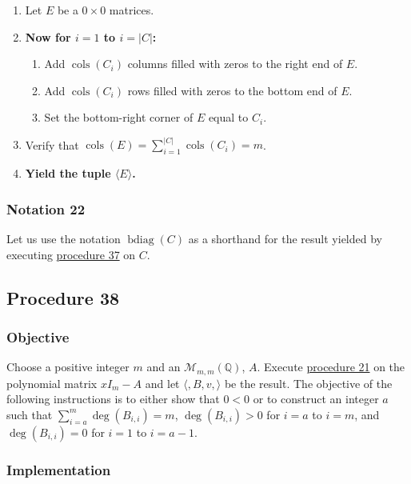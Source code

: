 \documentclass[twocolumn]{article}
\DeclareMathOperator{\bdiag}{bdiag}
\DeclareMathOperator{\cols}{cols}
\newcommand{\notation}[1]{\subsubsection*{Notation #1}}
\newcommand{\procedure}[2][]{\subsection*{Procedure #2 \ifthenelse{\equal{#1}{}}{}{(#1)}}\label{sec:procedure #2}}
\newcommand{\objective}{\subsubsection*{Objective}}
\newcommand{\implementation}{\subsubsection*{Implementation}}
\begin{document}
				\begin{enumerate}
					\item Let $E$ be a $0\times 0$ matrices.
					\item \textbf{Now for $i=1$ to $i=\lvert C\rvert$:}
					\begin{enumerate}
						\item Add $\cols(C_i)$ columns filled with zeros to the right end of $E$.
						\item Add $\cols(C_i)$ rows filled with zeros to the bottom end of $E$.
						\item Set the bottom-right corner of $E$ equal to $C_i$.
					\end{enumerate}
					\item Verify that $\cols(E)=\sum_{i=1}^{\lvert C\rvert}\cols(C_i)=m$.
					\item \textbf{Yield the tuple $\langle E\rangle$.}
				\end{enumerate}
		\notation{22}
			Let us use the notation $\bdiag(C)$ as a shorthand for the result yielded by executing \hyperref[sec:procedure 37]{procedure 37} on $C$.
		\procedure{38}
			\objective
				Choose a positive integer $m$ and an $\mathcal{M}_{m,m}(\mathbb{Q})$, $A$. Execute \hyperref[sec:procedure 21]{procedure 21} on the polynomial matrix $xI_m-A$ and let $\langle ,B,v,\rangle$ be the result. The objective of the following instructions is to either show that $0<0$ or to construct an integer $a$ such that $\sum_{i=a}^m\deg(B_{i,i})=m$, $\deg(B_{i,i})>0$ for $i=a$ to $i=m$, and $\deg(B_{i,i})=0$ for $i=1$ to $i=a-1$.
			\implementation
\end{document}
